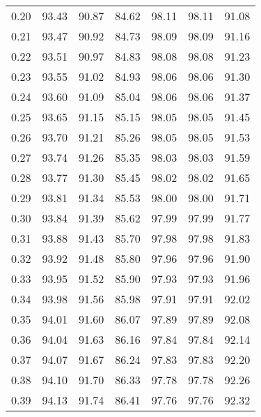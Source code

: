 \begin{tabular}{|c|c|c|c|c|c|c|}
      0.20 &     93.43 &     90.87 &      84.62 &   98.11 &      98.11 &         91.08 \\
      0.21 &     93.47 &     90.92 &      84.73 &   98.09 &      98.09 &         91.16 \\
      0.22 &     93.51 &     90.97 &      84.83 &   98.08 &      98.08 &         91.23 \\
      0.23 &     93.55 &     91.02 &      84.93 &   98.06 &      98.06 &         91.30 \\
      0.24 &     93.60 &     91.09 &      85.04 &   98.06 &      98.06 &         91.37 \\
      0.25 &     93.65 &     91.15 &      85.15 &   98.05 &      98.05 &         91.45 \\
      0.26 &     93.70 &     91.21 &      85.26 &   98.05 &      98.05 &         91.53 \\
      0.27 &     93.74 &     91.26 &      85.35 &   98.03 &      98.03 &         91.59 \\
      0.28 &     93.77 &     91.30 &      85.45 &   98.02 &      98.02 &         91.65 \\
      0.29 &     93.81 &     91.34 &      85.53 &   98.00 &      98.00 &         91.71 \\
      0.30 &     93.84 &     91.39 &      85.62 &   97.99 &      97.99 &         91.77 \\
      0.31 &     93.88 &     91.43 &      85.70 &   97.98 &      97.98 &         91.83 \\
      0.32 &     93.92 &     91.48 &      85.80 &   97.96 &      97.96 &         91.90 \\
      0.33 &     93.95 &     91.52 &      85.90 &   97.93 &      97.93 &         91.96 \\
      0.34 &     93.98 &     91.56 &      85.98 &   97.91 &      97.91 &         92.02 \\
      0.35 &     94.01 &     91.60 &      86.07 &   97.89 &      97.89 &         92.08 \\
      0.36 &     94.04 &     91.63 &      86.16 &   97.84 &      97.84 &         92.14 \\
      0.37 &     94.07 &     91.67 &      86.24 &   97.83 &      97.83 &         92.20 \\
      0.38 &     94.10 &     91.70 &      86.33 &   97.78 &      97.78 &         92.26 \\
      0.39 &     94.13 &     91.74 &      86.41 &   97.76 &      97.76 &         92.32 \\

\end{tabular}
